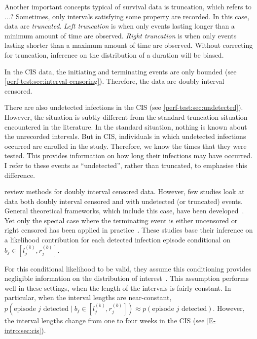 \documentclass[thesis.tex]{subfiles}
\begin{document}
Another important concepts typical of survival data is truncation, which refers to ...?
Sometimes, only intervals satisfying some property are recorded.
In this case, data are \emph{truncated}.
\emph{Left truncation} is when only events lasting longer than a minimum amount of time are observed.
\emph{Right truncation} is when only events lasting shorter than a maximum amount of time are observed.
Without correcting for truncation, inference on the distribution of a duration will be biased.

In the CIS data, the initiating and terminating events are only bounded (see \cref{perf-test:sec:interval-censoring}).
Therefore, the data are doubly interval censored.

There are also undetected infections in the CIS (see \cref{perf-test:sec:undetected}).
However, the situation is subtly different from the standard truncation situation encountered in the literature.
In the standard situation, nothing is known about the unrecorded intervals.
But in CIS, individuals in which undetected infections occurred are enrolled in the study.
Therefore, we know the times that they were tested.
This provides information on how long their infections may have occurred.
I refer to these events as ``undetected'', rather than truncated, to emphasise this difference.

\Textcite{sunAnalysis,bogaertsSurvival} review methods for doubly interval censored data.
However, few studies look at data both doubly interval censored and with undetected (or truncated) events.
General theoretical frameworks, which include this case, have been developed~\autocite{turnbullEmpirical,dempsterMaximum}.
Yet only the special case where the terminating event is either uncensored or right censored has been applied in practice~\autocite[e.g.][]{sunEmpirical,bacchettiNonparametric,shenNonparametric}.
These studies base their inference on a likelihood contribution for each detected infection episode conditional on $b_j \in [l_j^{(b)}, r_j^{(b)}]$.

For this conditional likelihood to be valid, they assume this conditioning provides negligible information on the distribution of interest~.
This assumption performs well in these settings, when the length of the intervals is fairly constant.
In particular, when the interval lengths are near-constant, $p(\text{episode $j$ detected} \mid b_j \in [l_j^{(b)}, r_j^{(b)}]) \approx p(\text{episode $j$ detected})$.
However, the interval lengths change from one to four weeks in the CIS (see \cref{E-intro:sec:cis}).
\end{document}
